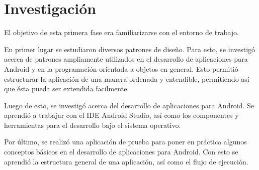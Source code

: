 \section{Investigación} \label{sect:Investigacion}

El objetivo de esta primera fase era familiarizarse con el entorno de trabajo.

En primer lugar se estudiaron diversos patrones de diseño. Para esto, se investigó acerca de patrones ampliamente utilizados en el desarrollo de aplicaciones para Android y en la programación orientada a objetos en general. Esto permitió estructurar la aplicación de una manera ordenada y entendible, permitiendo así que ésta pueda ser extendida facilmente.

Luego de esto, se investigó acerca del desarrollo de aplicaciones para Android. Se aprendió a trabajar con el IDE Android Studio, así como los componentes y herramientas para el desarrollo bajo el sistema operativo.

Por último, se realizó una aplicación de prueba para poner en práctica algunos conceptos básicos en el desarrollo de aplicaciones para Android. Con esto se aprendió la estructura general de una aplicación, así como el flujo de ejecución.


